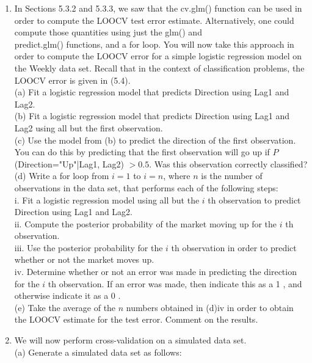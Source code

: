 \documentclass[10pt]{article}
\begin{document}
\begin{enumerate}
(a) Using the summary() and glm() functions, determine the estimated standard errors for the coefficients associated with income and balance in a multiple logistic regression model that uses both predictors.\\
(b) Write a function, boot.fn(), that takes as input the Default data set as well as an index of the observations, and that outputs the coefficient estimates for income and balance in the multiple logistic regression model.\\
(c) Use the boot() function together with your boot.fn() function to estimate the standard errors of the logistic regression coefficients for income and balance.\\
(d) Comment on the estimated standard errors obtained using the glm() function and using your bootstrap function.
  \item In Sections 5.3.2 and 5.3.3, we saw that the cv.glm() function can be used in order to compute the LOOCV test error estimate. Alternatively, one could compute those quantities using just the glm() and\\
predict.glm() functions, and a for loop. You will now take this approach in order to compute the LOOCV error for a simple logistic regression model on the Weekly data set. Recall that in the context of classification problems, the LOOCV error is given in (5.4).\\
(a) Fit a logistic regression model that predicts Direction using Lag1 and Lag2.\\
(b) Fit a logistic regression model that predicts Direction using Lag1 and Lag2 using all but the first observation.\\
(c) Use the model from (b) to predict the direction of the first observation. You can do this by predicting that the first observation will go up if $P$ (Direction="Up"|Lag1, Lag2) $>0.5$. Was this observation correctly classified?\\
(d) Write a for loop from $i=1$ to $i=n$, where $n$ is the number of observations in the data set, that performs each of the following steps:\\
i. Fit a logistic regression model using all but the $i$ th observation to predict Direction using Lag1 and Lag2.\\
ii. Compute the posterior probability of the market moving up for the $i$ th observation.\\
iii. Use the posterior probability for the $i$ th observation in order to predict whether or not the market moves up.\\
iv. Determine whether or not an error was made in predicting the direction for the $i$ th observation. If an error was made, then indicate this as a 1 , and otherwise indicate it as a 0 .\\
(e) Take the average of the $n$ numbers obtained in (d)iv in order to obtain the LOOCV estimate for the test error. Comment on the results.
  \item We will now perform cross-validation on a simulated data set.\\
(a) Generate a simulated data set as follows:
\end{enumerate}
\end{document}
